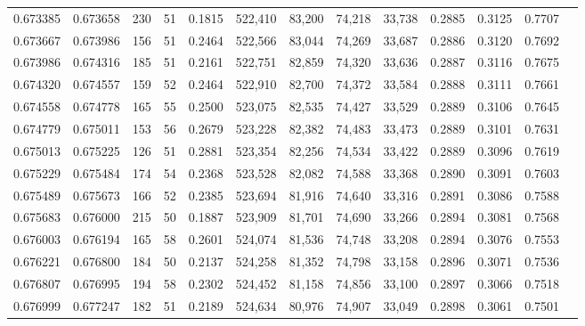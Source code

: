\begin{tabular}{rrrrrrrrrrrrr}
0.673385 & 0.673658 &   230 &  51 &                                     0.1815 & 522,410 &  83,200 &  74,218 &  33,738 & 0.2885 & 0.3125 & 0.7707 \\
0.673667 & 0.673986 &   156 &  51 &                                     0.2464 & 522,566 &  83,044 &  74,269 &  33,687 & 0.2886 & 0.3120 & 0.7692 \\
0.673986 & 0.674316 &   185 &  51 &                                     0.2161 & 522,751 &  82,859 &  74,320 &  33,636 & 0.2887 & 0.3116 & 0.7675 \\
0.674320 & 0.674557 &   159 &  52 &                                     0.2464 & 522,910 &  82,700 &  74,372 &  33,584 & 0.2888 & 0.3111 & 0.7661 \\
0.674558 & 0.674778 &   165 &  55 &                                     0.2500 & 523,075 &  82,535 &  74,427 &  33,529 & 0.2889 & 0.3106 & 0.7645 \\
0.674779 & 0.675011 &   153 &  56 &                                     0.2679 & 523,228 &  82,382 &  74,483 &  33,473 & 0.2889 & 0.3101 & 0.7631 \\
0.675013 & 0.675225 &   126 &  51 &                                     0.2881 & 523,354 &  82,256 &  74,534 &  33,422 & 0.2889 & 0.3096 & 0.7619 \\
0.675229 & 0.675484 &   174 &  54 &                                     0.2368 & 523,528 &  82,082 &  74,588 &  33,368 & 0.2890 & 0.3091 & 0.7603 \\
0.675489 & 0.675673 &   166 &  52 &                                     0.2385 & 523,694 &  81,916 &  74,640 &  33,316 & 0.2891 & 0.3086 & 0.7588 \\
0.675683 & 0.676000 &   215 &  50 &                                     0.1887 & 523,909 &  81,701 &  74,690 &  33,266 & 0.2894 & 0.3081 & 0.7568 \\
0.676003 & 0.676194 &   165 &  58 &                                     0.2601 & 524,074 &  81,536 &  74,748 &  33,208 & 0.2894 & 0.3076 & 0.7553 \\
0.676221 & 0.676800 &   184 &  50 &                                     0.2137 & 524,258 &  81,352 &  74,798 &  33,158 & 0.2896 & 0.3071 & 0.7536 \\
0.676807 & 0.676995 &   194 &  58 &                                     0.2302 & 524,452 &  81,158 &  74,856 &  33,100 & 0.2897 & 0.3066 & 0.7518 \\
0.676999 & 0.677247 &   182 &  51 &                                     0.2189 & 524,634 &  80,976 &  74,907 &  33,049 & 0.2898 & 0.3061 & 0.7501 \\

\end{tabular}
